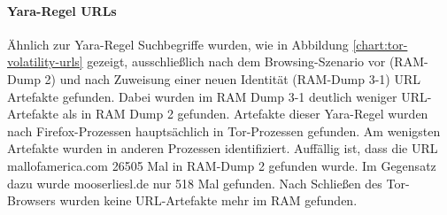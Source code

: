 \paragraph*{Yara-Regel \grqq{}URLs\grqq{}}
Ähnlich zur Yara-Regel \grqq{}Suchbegriffe\grqq{} wurden, wie in Abbildung \ref{chart:tor-volatility-urls} gezeigt, ausschließlich nach dem Browsing-Szenario vor (RAM-Dump 2) und nach Zuweisung einer neuen Identität (RAM-Dump 3-1) URL Artefakte gefunden. Dabei wurden im RAM Dump 3-1 deutlich weniger URL-Artefakte als in RAM Dump 2 gefunden. 
Artefakte dieser Yara-Regel wurden nach Firefox-Prozessen hauptsächlich in Tor-Prozessen gefunden. Am wenigsten Artefakte wurden in anderen Prozessen identifiziert.
Auffällig ist, dass die URL \grqq{}mallofamerica.com\grqq{} 26505 Mal in RAM-Dump 2 gefunden wurde. Im Gegensatz dazu wurde \grqq{}mooserliesl.de\grqq{} nur 518 Mal gefunden. Nach Schließen des Tor-Browsers wurden keine URL-Artefakte mehr im RAM gefunden.
